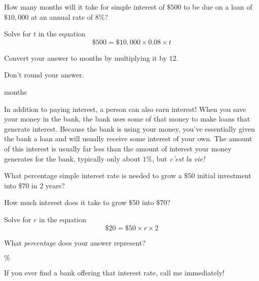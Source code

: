 \documentclass{ximera}
\begin{document}
\begin{question}
How many months will it take for simple interest of $\$500$ to be due on a loan of $\$10,000$ at an annual rate of $8\%$? 	

\begin{hint}
Solve for $t$ in the equation
\begin{equation*}\$500=\$10,000\times 0.08\times t\end{equation*}
\end{hint}
\begin{hint}
Convert your answer to months by multiplying it by $12$.
\end{hint}
\begin{hint}
Don't round your answer.
\end{hint}
 months

\end{question}

In addition to paying interest, a person can also earn interest! When you save your money in the bank, the bank uses some of that money to make loans that generate interest. Because the bank is using your money, you've essentially given the bank a loan and will usually receive some interest of your own. The amount of this interest is usually far less than the amount of interest your money generates for the bank, typically only about $1\%$, but \emph{c'est la vie!}

\begin{question}
What percentage simple interest rate is needed to grow a $\$50$ initial investment into $\$70$ in $2$ years?


\begin{hint}
How much interest does it take to grow $\$50$ into $\$70$?
\end{hint}
\begin{hint}
Solve for $r$ in the equation
\begin{equation*}\$20=\$50\times r\times 2\end{equation*}
\end{hint}
\begin{hint}
What \emph{percentage} does your answer represent?
\end{hint}
$\%$


If you ever find a bank offering that interest rate, call me immediately!
\end{question}
\end{document}
